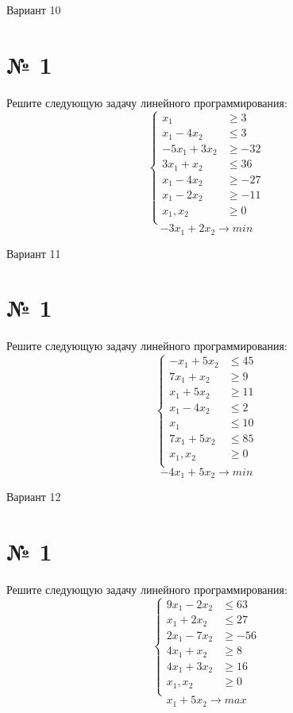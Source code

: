 \documentclass{article}%
\begin{document}
%
\newpage%
\begin{center}%
\begin{Huge}%
Вариант 10%
\end{Huge}%
\end{center}%
\section*{№ 1}%
\label{sec:1}%
Решите следующую задачу линейного программирования: %
\[%
\left\{\begin{aligned}x_{1} & \ge3 \\x_{1}-4x_{2} & \le3 \\-5x_{1}+3x_{2} & \ge-32 \\3x_{1}+x_{2} & \le36 \\x_{1}-4x_{2} & \ge-27 \\x_{1}-2x_{2} & \ge-11 \\x_{1},x_{2} & \ge 0 \\\end{aligned}\right.%
\]%
\[%
-3x_{1}+2x_{2}  \to min%
\]

%
\newpage%
\begin{center}%
\begin{Huge}%
Вариант 11%
\end{Huge}%
\end{center}%
\section*{№ 1}%
\label{sec:1}%
Решите следующую задачу линейного программирования: %
\[%
\left\{\begin{aligned}-x_{1}+5x_{2} & \le45 \\7x_{1}+x_{2} & \ge9 \\x_{1}+5x_{2} & \ge11 \\x_{1}-4x_{2} & \le2 \\x_{1} & \le10 \\7x_{1}+5x_{2} & \le85 \\x_{1},x_{2} & \ge 0 \\\end{aligned}\right.%
\]%
\[%
-4x_{1}+5x_{2}  \to min%
\]

%
\newpage%
\begin{center}%
\begin{Huge}%
Вариант 12%
\end{Huge}%
\end{center}%
\section*{№ 1}%
\label{sec:1}%
Решите следующую задачу линейного программирования: %
\[%
\left\{\begin{aligned}9x_{1}-2x_{2} & \le63 \\x_{1}+2x_{2} & \le27 \\2x_{1}-7x_{2} & \ge-56 \\4x_{1}+x_{2} & \ge8 \\4x_{1}+3x_{2} & \ge16 \\x_{1},x_{2} & \ge 0 \\\end{aligned}\right.%
\]%
\[%
x_{1}+5x_{2}  \to max%
\]
\end{document}
